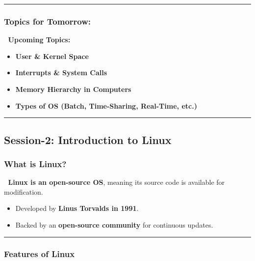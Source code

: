 \documentclass[
]{article}
\providecommand{\tightlist}{%
  \setlength{\itemsep}{0pt}\setlength{\parskip}{0pt}}
\begin{document}
\begin{center}\rule{0.5\linewidth}{0.5pt}\end{center}

\subsubsection{\texorpdfstring{\textbf{Topics for
Tomorrow:}}{Topics for Tomorrow:}}\label{topics-for-tomorrow}

📌 \textbf{Upcoming Topics:}

\begin{itemize}
\tightlist
\item
  \textbf{User \& Kernel Space}
\item
  \textbf{Interrupts \& System Calls}
\item
  \textbf{Memory Hierarchy in Computers}
\item
  \textbf{Types of OS (Batch, Time-Sharing, Real-Time, etc.)}
\end{itemize}

\begin{center}\rule{0.5\linewidth}{0.5pt}\end{center}

\subsection{\texorpdfstring{\textbf{Session-2: Introduction to
Linux}}{Session-2: Introduction to Linux}}\label{session-2-introduction-to-linux}

\subsubsection{\texorpdfstring{\textbf{What is
Linux?}}{What is Linux?}}\label{what-is-linux}

📌 \textbf{Linux is an open-source OS}, meaning its source code is
available for modification.

\begin{itemize}
\tightlist
\item
  Developed by \textbf{Linus Torvalds in 1991}.
\item
  Backed by an \textbf{open-source community} for continuous updates.
\end{itemize}

\begin{center}\rule{0.5\linewidth}{0.5pt}\end{center}

\subsubsection{\texorpdfstring{\textbf{Features of
Linux}}{Features of Linux}}\label{features-of-linux}
\end{document}
